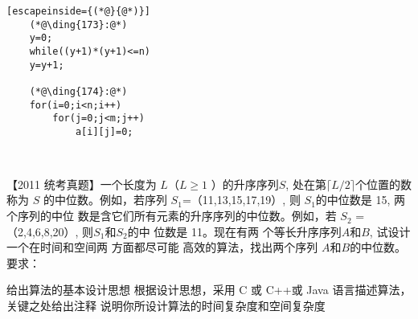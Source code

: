 \begin{questions}[tr]
\begin{bbox}
\begin{lstlisting}[escapeinside={(*@}{@*)}]
    (*@\ding{173}:@*)
    y=0;
    while((y+1)*(y+1)<=n)
    y=y+1;

    (*@\ding{174}:@*)
    for(i=0;i<n;i++)
        for(j=0;j<m;j++)
            a[i][j]=0;
    
        
        \end{lstlisting}
    \end{bbox}

    \begin{bbox}
        \question[2] 【2011 统考真题】一个长度为 $L$（$L\geqslant 1$ ）的升序序列$ S$, 处在第$\lceil L/2\rceil $个位置的数称为 $S$
        的中位数。例如，若序列 $S_1$=（11,13,15,17,19）, 则 $S_1$的中位数是 15, 两 个序列的中位
        数是含它们所有元素的升序序列的中位数。例如，若 $S_2$ =（2,4,6,8,20）, 则$S_1$和$S_2$的中
        位数是 11。现在有两 个等长升序序列$A$和$B$, 试设计一个在时间和空间两 方面都尽可能
        高效的算法，找出两个序列 $A$和$B$的中位数。要求：
        \begin{subquestions}
            \subquestion 给出算法的基本设计思想
            \subquestion  根据设计思想，采用 C 或 C++或 Java 语言描述算法，关键之处给出注释
            \subquestion 说明你所设计算法的时间复杂度和空间复杂度
        \end{subquestions}
    \end{bbox}
\end{questions}
    